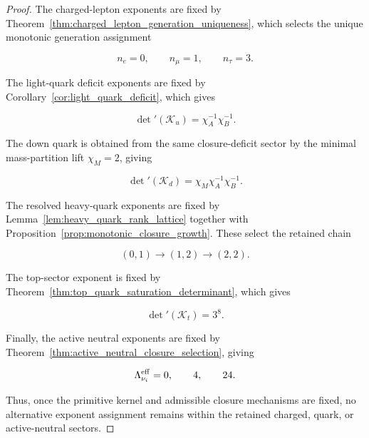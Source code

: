 \documentclass[11pt]{article}
\theoremstyle{definition}
\theoremstyle{remark}
\begin{document}
\begin{proof}

The charged-lepton exponents are fixed by
Theorem~\ref{thm:charged_lepton_generation_uniqueness}, which
selects the unique monotonic generation assignment

\begin{equation}
n_e=0,
\qquad
n_\mu=1,
\qquad
n_\tau=3.
\end{equation}

The light-quark deficit exponents are fixed by
Corollary~\ref{cor:light_quark_deficit}, which gives

\begin{equation}
\det{}'(\mathcal K_u)
=
\chi_A^{-1}\chi_B^{-1}.
\end{equation}

The down quark is obtained from the same closure-deficit sector
by the minimal mass-partition lift \(\chi_M=2\), giving

\begin{equation}
\det{}'(\mathcal K_d)
=
\chi_M\chi_A^{-1}\chi_B^{-1}.
\end{equation}

The resolved heavy-quark exponents are fixed by
Lemma~\ref{lem:heavy_quark_rank_lattice} together with
Proposition~\ref{prop:monotonic_closure_growth}. These select
the retained chain

\begin{equation}
(0,1)
\longrightarrow
(1,2)
\longrightarrow
(2,2).
\end{equation}

The top-sector exponent is fixed by
Theorem~\ref{thm:top_quark_saturation_determinant}, which gives

\begin{equation}
\det{}'(\mathcal K_t)
=
3^8.
\end{equation}

Finally, the active neutral exponents are fixed by
Theorem~\ref{thm:active_neutral_closure_selection}, giving

\begin{equation}
\Lambda_{\nu_i}^{\rm eff}
=
0,
\qquad
4,
\qquad
24.
\end{equation}

Thus, once the primitive kernel and admissible closure
mechanisms are fixed, no alternative exponent assignment remains
within the retained charged, quark, or active-neutral sectors.

\end{proof}
\end{document}

